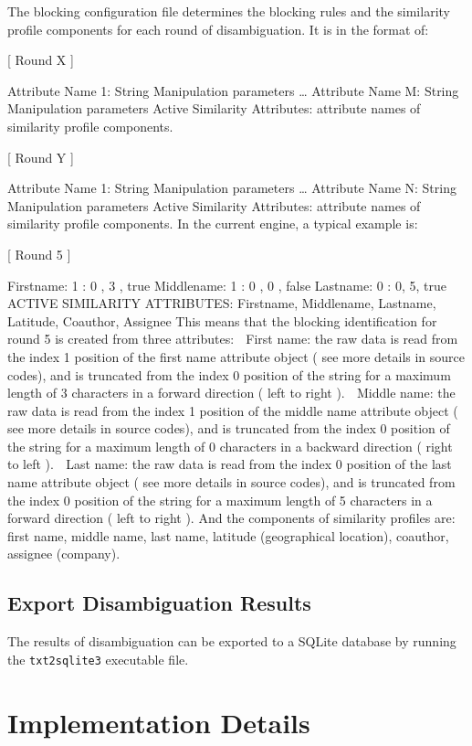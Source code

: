 \documentclass{article}
\begin{document}
The blocking configuration file determines the blocking 
rules and the similarity profile components
for each round of disambiguation. It is in the format of:

[ Round X ]

Attribute Name 1: String Manipulation parameters
…
Attribute Name M: String Manipulation parameters
Active Similarity Attributes: attribute names of similarity profile components.

[ Round Y ]

Attribute Name 1: String Manipulation parameters
…
Attribute Name N: String Manipulation parameters
Active Similarity Attributes: attribute names of similarity profile components.
In the current engine, a typical example is:

[ Round 5 ]

Firstname: 1 : 0 , 3 , true
Middlename: 1 : 0 , 0 , false
Lastname: 0 : 0, 5, true
ACTIVE SIMILARITY ATTRIBUTES: Firstname, Middlename, Lastname, Latitude, Coauthor,
Assignee
This means that the blocking identification for round 5 is created from three attributes:
 First name: the raw data is read from the index 1 position of the first name attribute object ( see
more details in source codes), and is truncated from the index 0 position of the string for a
maximum length of 3 characters in a forward direction ( left to right ).
 Middle name: the raw data is read from the index 1 position of the middle name attribute object
( see more details in source codes), and is truncated from the index 0 position of the string for a
maximum length of 0 characters in a backward direction ( right to left ).
 Last name: the raw data is read from the index 0 position of the last name attribute object ( see
more details in source codes), and is truncated from the index 0 position of the string for a
maximum length of 5 characters in a forward direction ( left to right ).
And the components of similarity profiles are: first name, middle name, last name, latitude
(geographical location), coauthor, assignee (company).


\subsection{Export Disambiguation Results}

The results of disambiguation can be exported to a 
SQLite database by running the \texttt{txt2sqlite3}
executable file.



\section{Implementation Details}
\end{document}
